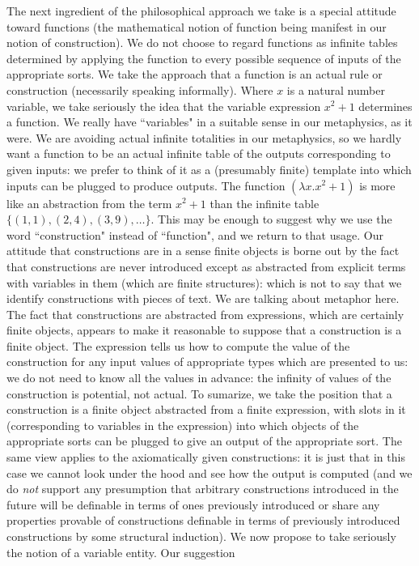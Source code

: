 \documentclass[12pt]{article}
\begin{document}
The next ingredient of the philosophical approach we take is a special attitude toward functions (the mathematical notion of function being manifest in our notion of construction).   We do not choose to regard functions as infinite tables determined by applying the function to every possible sequence of inputs of the appropriate sorts.  We take the approach that a function is an actual rule or construction (necessarily speaking informally).  Where $x$ is a natural number variable, we take seriously the idea that the variable expression $x^2+1$ determines a function.  We really have ``variables" in a suitable sense in our metaphysics, as it were.  We are avoiding actual infinite totalities in our metaphysics, so we hardly want a function to be an actual infinite table of the outputs corresponding to given inputs:  we prefer to think of it as a (presumably finite) template into which inputs can be plugged to produce outputs.  The function $(\lambda x.x^2+1)$ is more like an abstraction from the term $x^2+1$ than the infinite table $\{(1,1),(2,4),(3,9),\ldots\}$.  This may be enough to suggest why we use the word ``construction" instead of ``function", and we return to that usage.  Our attitude that constructions are in a sense finite objects is borne out by the fact that constructions are never introduced except as abstracted from explicit terms with variables in them (which are finite structures):  which is not to say that we identify constructions with pieces of text.  We are talking about metaphor here.   The fact that constructions are abstracted from expressions, which are certainly finite objects, appears to make it reasonable to suppose that a construction is a finite object.  The expression tells us how to compute the value of the construction for any input values of appropriate types which are presented to us:  we do not need to know all the values in advance:  the infinity of values of the construction is potential, not actual.
 To sumarize, we take the position that a construction is a finite object abstracted from a finite expression,
with slots in it (corresponding to variables in the expression) into which objects of the appropriate sorts can be plugged to give an output of the appropriate sort.  The same view applies to the axiomatically given constructions:  it is just that in this case we cannot look under the hood and see how the output is computed (and we do {\em not\/} support any presumption that arbitrary constructions introduced in the future will be definable in terms of ones previously introduced or share any properties provable of constructions definable in terms of previously introduced constructions by some structural induction).  We now propose to take seriously the notion of a variable entity.  Our suggestion
\end{document}

